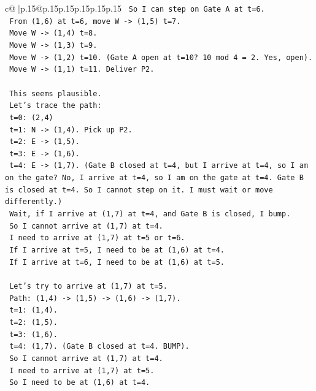 \documentclass{article}
\begin{document}
{\begin{supertabular}{c@{$\;$}|p{.15\linewidth}@{}p{.15\linewidth}p{.15\linewidth}p{.15\linewidth}p{.15\linewidth}p{.15\linewidth}}
{{{\texttt{   So I can step on Gate A at t=6.} \\
\texttt{   From (1,6) at t=6, move W {-}> (1,5) t=7.} \\
\texttt{   Move W {-}> (1,4) t=8.} \\
\texttt{   Move W {-}> (1,3) t=9.} \\
\texttt{   Move W {-}> (1,2) t=10. (Gate A open at t=10? 10 mod 4 = 2. Yes, open).} \\
\texttt{   Move W {-}> (1,1) t=11. Deliver P2.} \\
\\ 
\texttt{   This seems plausible.} \\
\texttt{   Let's trace the path:} \\
\texttt{   t=0: (2,4)} \\
\texttt{   t=1: N {-}> (1,4). Pick up P2.} \\
\texttt{   t=2: E {-}> (1,5).} \\
\texttt{   t=3: E {-}> (1,6).} \\
\texttt{   t=4: E {-}> (1,7). (Gate B closed at t=4, but I arrive at t=4, so I am on the gate? No, I arrive at t=4, so I am on the gate at t=4. Gate B is closed at t=4. So I cannot step on it. I must wait or move differently.)} \\
\texttt{   Wait, if I arrive at (1,7) at t=4, and Gate B is closed, I bump.} \\
\texttt{   So I cannot arrive at (1,7) at t=4.} \\
\texttt{   I need to arrive at (1,7) at t=5 or t=6.} \\
\texttt{   If I arrive at t=5, I need to be at (1,6) at t=4.} \\
\texttt{   If I arrive at t=6, I need to be at (1,6) at t=5.} \\
\\ 
\texttt{   Let's try to arrive at (1,7) at t=5.} \\
\texttt{   Path: (1,4) {-}> (1,5) {-}> (1,6) {-}> (1,7).} \\
\texttt{   t=1: (1,4).} \\
\texttt{   t=2: (1,5).} \\
\texttt{   t=3: (1,6).} \\
\texttt{   t=4: (1,7). (Gate B closed at t=4. BUMP).} \\
\texttt{   So I cannot arrive at (1,7) at t=4.} \\
\texttt{   I need to arrive at (1,7) at t=5.} \\
\texttt{   So I need to be at (1,6) at t=4.} \\
}}}
\end{supertabular}}
\end{document}
